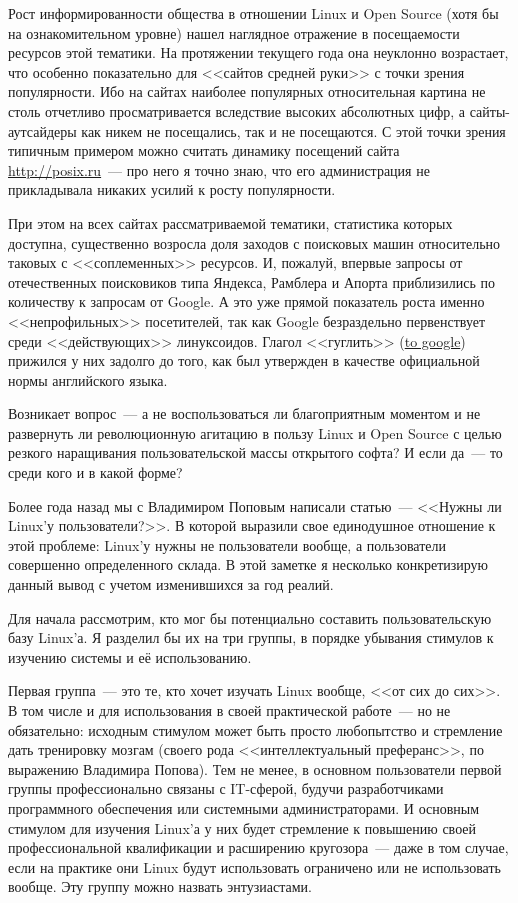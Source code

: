 Рост информированности общества в отношении Linux и Open Source (хотя бы на ознакомительном уровне) нашел наглядное отражение в посещаемости ресурсов этой тематики. На протяжении текущего года она неуклонно возрастает, что особенно показательно для <<сайтов средней руки>> с точки зрения популярности. Ибо на сайтах наиболее популярных относительная картина не столь отчетливо просматривается вследствие высоких абсолютных цифр, а сайты-аутсайдеры как никем не посещались, так и не посещаются. С этой точки зрения типичным примером можно считать динамику посещений сайта \url{http://posix.ru}~--- про него я точно знаю, что его администрация не прикладывала никаких усилий к росту популярности.

При этом на всех сайтах рассматриваемой тематики, статистика которых доступна, существенно возросла доля заходов с поисковых машин относительно таковых с <<соплеменных>> ресурсов. И, пожалуй, впервые запросы от отечественных поисковиков типа Яндекса, Рамблера и Апорта приблизились по количеству к запросам от Google. А это уже прямой показатель роста именно <<непрофильных>> посетителей, так как Google безраздельно первенствует среди <<действующих>> линуксоидов. Глагол <<гуглить>> (\href{http://en.wikipedia.org/w/index.php?title=Google_(verb)\&oldid=582812741}{to google}) прижился у них задолго до того, как был утвержден в качестве официальной нормы английского языка.

Возникает вопрос~--- а не воспользоваться ли благоприятным моментом и не развернуть ли революционную агитацию в пользу Linux и Open Source с целью резкого наращивания пользовательской массы открытого софта? И если да~--- то среди кого и в какой форме?

Более года назад мы с Владимиром Поповым написали статью~--- <<Нужны ли Linux'у пользователи?>>. В которой выразили свое единодушное отношение к этой проблеме: Linux'у нужны не пользователи вообще, а пользователи совершенно определенного склада. В этой заметке я несколько конкретизирую данный вывод с учетом изменившихся за год реалий.

Для начала рассмотрим, кто мог бы потенциально составить пользовательскую базу Linux'а. Я разделил бы их на три группы, в порядке убывания стимулов к изучению системы и её использованию.

Первая группа~--- это те, кто хочет изучать Linux вообще, <<от сих до сих>>. В том числе и для использования в своей практической работе~--- но не обязательно: исходным стимулом может быть просто любопытство и стремление дать тренировку мозгам (своего рода <<интеллектуальный преферанс>>, по выражению Владимира Попова). Тем не менее, в основном пользователи первой группы профессионально связаны с IT-сферой, будучи разработчиками программного обеспечения или системными администраторами. И основным стимулом для изучения Linux'а у них будет стремление к повышению своей профессиональной квалификации и расширению кругозора~--- даже в том случае, если на практике они Linux будут использовать ограничено или не использовать вообще. Эту группу можно назвать энтузиастами.

